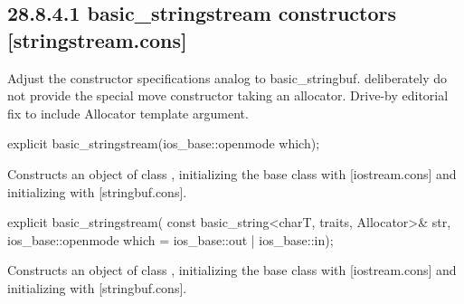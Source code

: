 \documentclass[ebook,11pt,article]{memoir}
\renewcommand{\iref}[1]{[#1]}
\begin{document}
\subsection{28.8.4.1 basic\_stringstream constructors [stringstream.cons]}
\begin{em}
Adjust the constructor specifications analog to basic_stringbuf. deliberately do not provide the special move constructor taking an allocator. Drive-by editorial fix to include Allocator template argument.
\end{em}

\begin{itemdecl}
explicit basic_stringstream(ios_base::openmode which);
\end{itemdecl}

\begin{itemdescr}
\pnum
\effects
Constructs an object of class
,
initializing the base class with
\iref{iostream.cons}
and initializing  with %
\iref{stringbuf.cons}.
\end{itemdescr}

%
\begin{itemdecl}
explicit basic_stringstream(
  const basic_string<charT, traits, Allocator>& str,
  ios_base::openmode which = ios_base::out | ios_base::in);
\end{itemdecl}

\begin{itemdescr}
\pnum
\effects
Constructs an object of class
,
initializing the base class with
\iref{iostream.cons}
and initializing  with%
\iref{stringbuf.cons}.
\end{itemdescr}
\end{document}
